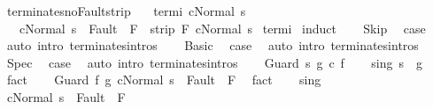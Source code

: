 \begin{isabellebody}
{}
\isamarkuptrue%
\isamarkupfalse%
\ terminates{\isacharunderscore}noFault{\isacharunderscore}strip{\isacharcolon}\isanewline
\ \ \ termi{\isacharcolon}\ {\isachardoublequoteopen}{\isasymGamma}{\isasymturnstile}c{\isasymdown}Normal\ s{\isachardoublequoteclose}\isanewline
\ \ \ {\isachardoublequoteopen}{\isasymlbrakk}{\isasymGamma}{\isasymturnstile}{\isasymlangle}c{\isacharcomma}Normal\ s\ {\isasymrangle}\ {\isasymRightarrow}{\isasymnotin}Fault\ {\isacharbackquote}\ F{\isasymrbrakk}\ {\isasymLongrightarrow}\ strip\ F\ {\isasymGamma}{\isasymturnstile}c{\isasymdown}Normal\ s{\isachardoublequoteclose}\isanewline
%
\isadelimproof
%
\endisadelimproof
%
\isatagproof
{}\isamarkupfalse%
\ termi\isanewline
{}\isamarkupfalse%
\ {\isacharparenleft}induct{\isacharparenright}\isanewline
\ \ \isamarkupfalse%
\ Skip\ \isamarkupfalse%
\ {\isacharquery}case\ \isamarkupfalse%
\ {\isacharparenleft}auto\ intro{\isacharcolon}\ terminates{\isachardot}intros{\isacharparenright}\isanewline
{}\isamarkupfalse%
\isanewline
\ \ \isamarkupfalse%
\ Basic\ \isamarkupfalse%
\ {\isacharquery}case\ \isamarkupfalse%
\ {\isacharparenleft}auto\ intro{\isacharcolon}\ terminates{\isachardot}intros{\isacharparenright}\isanewline
{}\isamarkupfalse%
\isanewline
\ \ \isamarkupfalse%
\ Spec\ \isamarkupfalse%
\ {\isacharquery}case\ \isamarkupfalse%
\ {\isacharparenleft}auto\ intro{\isacharcolon}\ terminates{\isachardot}intros{\isacharparenright}\isanewline
{}\isamarkupfalse%
\isanewline
\ \ \isamarkupfalse%
\ {\isacharparenleft}Guard\ s\ g\ c\ f{\isacharparenright}\isanewline
\ \ \isamarkupfalse%
\ s{\isacharunderscore}in{\isacharunderscore}g{\isacharcolon}\ {\isachardoublequoteopen}s\ {\isasymin}\ g{\isachardoublequoteclose}\ \isamarkupfalse%
\ fact\isanewline
\ \ \isamarkupfalse%
\ {\isachardoublequoteopen}{\isasymGamma}{\isasymturnstile}{\isasymlangle}Guard\ f\ g\ c{\isacharcomma}Normal\ s\ {\isasymrangle}\ {\isasymRightarrow}{\isasymnotin}Fault\ {\isacharbackquote}\ F{\isachardoublequoteclose}\ \isamarkupfalse%
\ fact\isanewline
\ \ \isamarkupfalse%
\ s{\isacharunderscore}in{\isacharunderscore}g\ \isamarkupfalse%
\ {\isachardoublequoteopen}{\isasymGamma}{\isasymturnstile}{\isasymlangle}c{\isacharcomma}Normal\ s\ {\isasymrangle}\ {\isasymRightarrow}{\isasymnotin}Fault\ {\isacharbackquote}\ F{\isachardoublequoteclose}\isanewline

\end{isabellebody}
